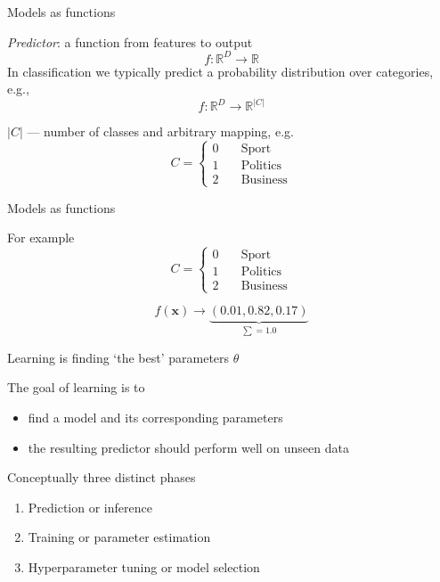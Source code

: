 \documentclass[12pt,aspectratio=169,handout]{beamer}
\begin{document}

\begin{frame}{Models as functions}

\emph{Predictor}: a function from features to output
$$
f: \mathbb{R}^{D} \to \mathbb{R}
$$
In classification we typically predict a probability distribution over categories, e.g.,
$$
f: \mathbb{R}^{D} \to \mathbb{R}^{|C|}
$$

$|C|$ --- number of classes and arbitrary mapping, e.g.
$$
C =
\begin{cases}
0  & \quad \text{Sport}\\
1  & \quad \text{Politics}\\
2  & \quad \text{Business}
\end{cases}
$$

\end{frame}


\begin{frame}{Models as functions}

For example	
$$
C =
\begin{cases}
0  & \quad \text{Sport}\\
1  & \quad \text{Politics}\\
2  & \quad \text{Business}
\end{cases}
$$
	
$$
f(\mathbf{x}) \to \underbrace{(0.01, 0.82, 0.17)}_{\sum = 1.0}
$$

	
\end{frame}


\begin{frame}{Learning is finding `the best' parameters $\theta$}

\begin{block}{The goal of learning is to}
\begin{itemize}
\item find a model and its corresponding parameters
\item the resulting predictor should perform well on unseen data
\end{itemize}
\end{block}

Conceptually three distinct phases

\begin{enumerate}
\item Prediction or inference
\item Training or parameter estimation
\item Hyperparameter tuning or model selection	
\end{enumerate}

\end{frame}
\end{document}
